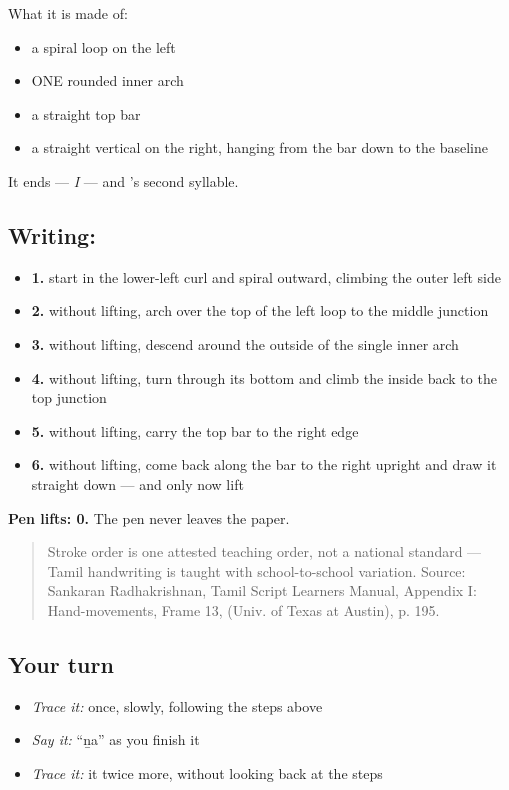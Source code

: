 What it is made of:

\begin{itemize}
\raggedright
  \item a spiral loop on the left
  \item ONE rounded inner arch
  \item a straight top bar
  \item a straight vertical on the right, hanging from the bar down to the baseline
\end{itemize}

It ends  — \emph{I} — and 's second syllable.

\subsection*{Writing: }

\begin{itemize}
\raggedright
  \item \textbf{1.} start in the lower-left curl and spiral outward, climbing the outer left side
  \item \textbf{2.} without lifting, arch over the top of the left loop to the middle junction
  \item \textbf{3.} without lifting, descend around the outside of the single inner arch
  \item \textbf{4.} without lifting, turn through its bottom and climb the inside back to the top junction
  \item \textbf{5.} without lifting, carry the top bar to the right edge
  \item \textbf{6.} without lifting, come back along the bar to the right upright and draw it straight down — and only now lift
\end{itemize}

\textbf{Pen lifts: 0.} The pen never leaves the paper.

\begin{quote}
Stroke order is one attested teaching order, not a national standard — Tamil handwriting is taught with school-to-school variation. Source: Sankaran Radhakrishnan, Tamil Script Learners Manual, Appendix I: Hand-movements, Frame 13,  (Univ. of Texas at Austin), p. 195.
\end{quote}

\subsection*{Your turn}
\begin{itemize}
\raggedright
  \item \emph{Trace it:}  once, slowly, following the steps above
  \item \emph{Say it:} \textquotedblleft{}ṉa\textquotedblright{} as you finish it
  \item \emph{Trace it:} it twice more, without looking back at the steps
\end{itemize}


